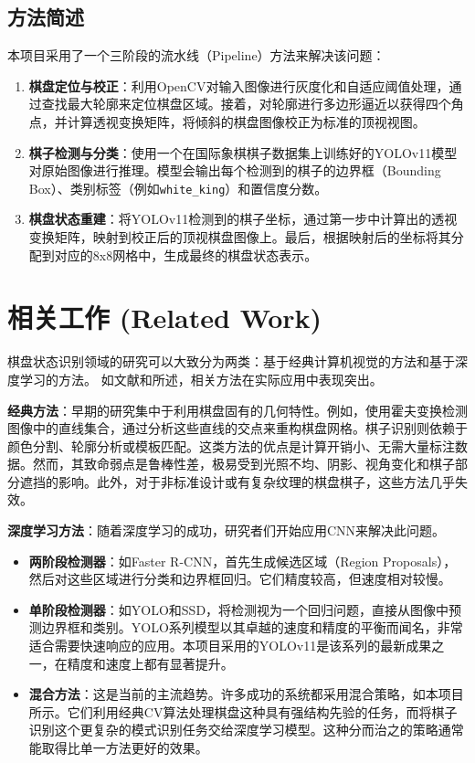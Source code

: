 \documentclass[12pt, a4paper]{article}
\begin{document}
\subsection{方法简述}
本项目采用了一个三阶段的流水线（Pipeline）方法来解决该问题：
\begin{enumerate}
    \item \textbf{棋盘定位与校正}：利用OpenCV对输入图像进行灰度化和自适应阈值处理，通过查找最大轮廓来定位棋盘区域。接着，对轮廓进行多边形逼近以获得四个角点，并计算透视变换矩阵，将倾斜的棋盘图像校正为标准的顶视视图。
    \item \textbf{棋子检测与分类}：使用一个在国际象棋棋子数据集上训练好的YOLOv11模型对原始图像进行推理。模型会输出每个检测到的棋子的边界框（Bounding Box）、类别标签（例如\texttt{white\_king}）和置信度分数。
    \item \textbf{棋盘状态重建}：将YOLOv11检测到的棋子坐标，通过第一步中计算出的透视变换矩阵，映射到校正后的顶视棋盘图像上。最后，根据映射后的坐标将其分配到对应的8x8网格中，生成最终的棋盘状态表示。
\end{enumerate}

\section{相关工作 (Related Work)}
棋盘状态识别领域的研究可以大致分为两类：基于经典计算机视觉的方法和基于深度学习的方法。
如文献\cite{yolo}和\cite{opencv}所述，相关方法在实际应用中表现突出。

\textbf{经典方法}：早期的研究集中于利用棋盘固有的几何特性。例如，使用霍夫变换检测图像中的直线集合，通过分析这些直线的交点来重构棋盘网格。棋子识别则依赖于颜色分割、轮廓分析或模板匹配。这类方法的优点是计算开销小、无需大量标注数据。然而，其致命弱点是鲁棒性差，极易受到光照不均、阴影、视角变化和棋子部分遮挡的影响。此外，对于非标准设计或有复杂纹理的棋盘棋子，这些方法几乎失效。

\textbf{深度学习方法}：随着深度学习的成功，研究者们开始应用CNN来解决此问题。
\begin{itemize}
    \item \textbf{两阶段检测器}：如Faster R-CNN，首先生成候选区域（Region Proposals），然后对这些区域进行分类和边界框回归。它们精度较高，但速度相对较慢。
    \item \textbf{单阶段检测器}：如YOLO和SSD，将检测视为一个回归问题，直接从图像中预测边界框和类别。YOLO系列模型以其卓越的速度和精度的平衡而闻名，非常适合需要快速响应的应用。本项目采用的YOLOv11是该系列的最新成果之一，在精度和速度上都有显著提升。
    \item \textbf{混合方法}：这是当前的主流趋势。许多成功的系统都采用混合策略，如本项目所示。它们利用经典CV算法处理棋盘这种具有强结构先验的任务，而将棋子识别这个更复杂的模式识别任务交给深度学习模型。这种分而治之的策略通常能取得比单一方法更好的效果。
\end{itemize}
\end{document}
